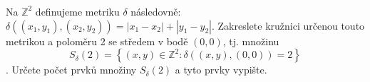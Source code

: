 \subsubsection{}
Na $\mathbb{Z}^{2}$ definujeme metriku $\delta$ následovně: $\delta
((x_{1},y_{1}),(x_{2},y_{2}))=\left | x_{1}-x_{2} \right |+\left | y_{1}-y_{2}
\right |$. Zakreslete kružnici určenou touto metrikou a poloměru 2 se středem v
bodě $(0,0)$, tj. množinu 
$$S_{\delta}(2) = \left \{ (x,y) \in \mathbb{Z}^{2}:
\delta((x,y),(0,0))=2 \right \}$$. 
Určete počet prvků množiny $S_{\delta}(2)$ a tyto prvky vypište.
